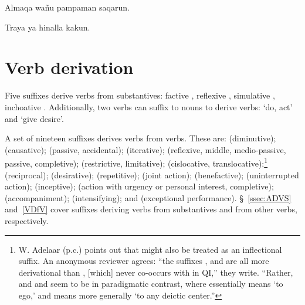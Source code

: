 %
{Almaqa wañu pampaman saqarun.}%
{}%
{}{}%

%
{Traya ya hinalla kakun.}%
{}%
{}{}%

\section{Verb derivation}\label{sec:verbderivation}
Five suffixes derive verbs from substantives: factive , reflexive , simulative , inchoative . Additionally, two verbs can suffix to nouns to derive verbs:  ‘do, act’ and  ‘give desire’.

A set of nineteen suffixes derives verbs from verbs. These are:  (diminutive);  (causative);  (passive, accidental);  (iterative);  (reflexive, middle, medio-passive, passive, completive);  (restrictive, limitative);  (cislocative, translocative);\footnote{W. Adelaar (p.c.) points out that  might also be treated as an inflectional suffix. An anonymous reviewer agrees: “the suffixes ,  and  are all more derivational than , [which] never co-occurs with  in QI,” they write. “Rather,  and and  seem to be in paradigmatic contrast, where  essentially means ‘to ego,’ and  means more generally ‘to any deictic center.”}  (reciprocal);  (desirative);  (repetitive);  (joint action);  (benefactive);  (uninterrupted action);  (inceptive);  (action with urgency or personal interest, completive);  (accompaniment);  (intensifying); and  (exceptional performance). §~\ref{ssec:ADVS} and~\ref{VDfV} cover suffixes deriving verbs from substantives and from other verbs, respectively.

